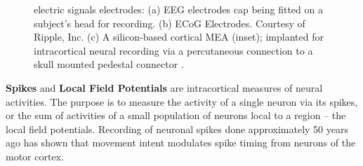 \begin{figure}[h!]
\centering
{}
\caption{electric signals electrodes: (a) EEG electrodes cap being fitted on a subject's head for recording. (b) ECoG Electrodes. Courtesy of Ripple, Inc. (c) A silicon-based cortical MEA (inset); implanted for intracortical neural recording via a percutaneous connection to a skull mounted pedestal connector \citep{homer_implants_2013}.} 
\label{fig:electrodes-electric}
\end{figure} 

    
\textbf{Spikes} and \textbf{Local Field Potentials} are intracortical measures of neural activities. 
The purpose is to measure the activity of a single neuron via its spikes, or the sum of activities of a small population of neurons local to a region -- the local field potentials.
Recording of neuronal spikes done approximately 50 years ago has shown that movement intent modulates spike timing from neurons of the motor cortex. 

